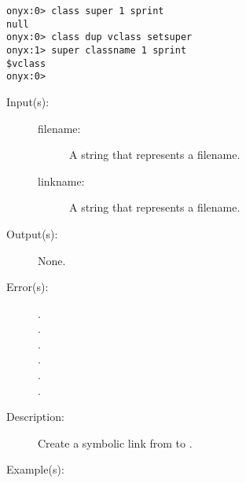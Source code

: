 \begin{description}
\begin{description}
\begin{verbatim}
onyx:0> class super 1 sprint
null
onyx:0> class dup vclass setsuper
onyx:1> super classname 1 sprint
$vclass
onyx:0>
		\end{verbatim}
	\end{description}
\label{systemdict:symlink}
\item[{\onyxop{filename linkname}{symlink}{--}}: ]
	\begin{description}\item[]
	\item[Input(s): ]
		\begin{description}\item[]
		\item[filename: ]
			A string that represents a filename.
		\item[linkname: ]
			A string that represents a filename.
		\end{description}
	\item[Output(s): ] None.
	\item[Error(s): ]
		\begin{description}\item[]
		\item[.]
		\item[.]
		\item[.]
		\item[.]
		\item[.]
		\item[.]
		\end{description}
	\item[Description: ]
		Create a symbolic link from  to
		.
	\item[Example(s): ]\begin{verbatim}


\end{verbatim}
\end{description}
\end{description}
